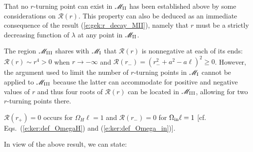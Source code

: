 \begin{remark}
That no $r$-turning point can exist in $\mathscr{M}_{\rm II}$ has been established
above by some considerations on $\mathcal{R}(r)$. This property can also be deduced as
an immediate consequence of the result (\ref{e:gek:r_decay_MII}), namely
that $r$ must be a strictly decreasing function of $\lambda$ at any point
in $\mathscr{M}_{\rm II}$.
\end{remark}


\begin{remark}
The region $\mathscr{M}_{\rm III}$ shares with $\mathscr{M}_{\rm I}$ that $\mathcal{R}(r)$ is
nonnegative at each of its ends: $\mathcal{R}(r) \sim r^4 > 0$ when $r\to -\infty$
and $\mathcal{R}(r_-) = (r_-^2 + a^2 - a \ell)^2 \geq 0$. However, the argument
used to limit the number of $r$-turning points in $\mathscr{M}_{\rm I}$
cannot be applied to $\mathscr{M}_{\rm III}$ because the latter can accommodate for positive and negative
values of $r$ and thus four roots of $\mathcal{R}(r)$ can be located in $\mathscr{M}_{\rm III}$, allowing
for two $r$-turning points there.
\end{remark}


\begin{remark}
$\mathcal{R}(r_+) = 0$ occurs for $\Omega_H \ell = 1$
and $\mathcal{R}(r_-) = 0$ for $\Omega_{\rm in} \ell = 1$ [cf. Eqs.~(\ref{e:ker:def_OmegaH}) and (\ref {e:ker:def_Omega_in})].
\end{remark}


In view of the above result, we can state:

